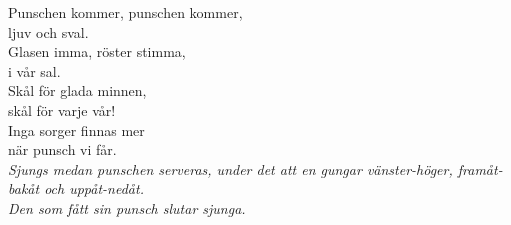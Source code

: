 \documentclass[a6paper,10pt]{article}
\begin{document}
\noindent
{}
\begin{center}
\end{center}
\small Punschen kommer, punschen kommer,\\
ljuv och sval.\\
Glasen imma, röster stimma,\\
i vår sal.\\
Skål för glada minnen,\\
skål för varje vår!\\
Inga sorger finnas mer\\
när punsch vi får.
\vspace{10pt}\\
\textit{Sjungs medan punschen serveras, under det att en gungar vänster-höger, framåt-bakåt och uppåt-nedåt.
\vspace{5pt}\\
Den som fått sin punsch slutar sjunga.}
\end{document}

